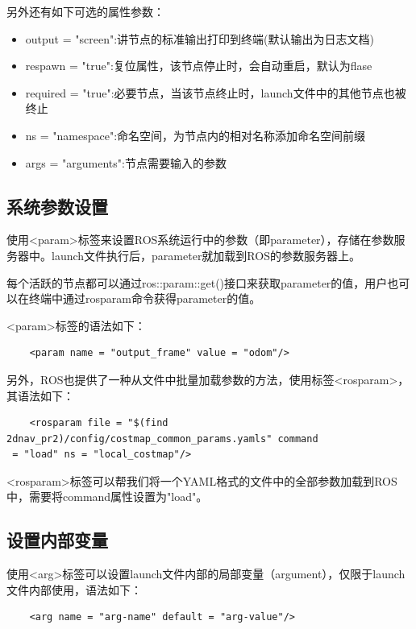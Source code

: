 \documentclass[10pt, oneside]{book}
\begin{document}
另外还有如下可选的属性参数：

\begin{itemize}
    \item output = "screen":讲节点的标准输出打印到终端(默认输出为日志文档)
    \item respawn = "true":复位属性，该节点停止时，会自动重启，默认为flase
    \item required = "true":必要节点，当该节点终止时，launch文件中的其他节点也被终止
    \item ns = "namespace":命名空间，为节点内的相对名称添加命名空间前缀
    \item args = "arguments":节点需要输入的参数
\end{itemize}

\subsection{系统参数设置}

使用<param>标签来设置ROS系统运行中的参数（即parameter），存储在参数服务器中。launch文件执行后，parameter就加载到ROS的参数服务器上。

每个活跃的节点都可以通过ros::param::get()接口来获取parameter的值，用户也可以在终端中通过rosparam命令获得parameter的值。

<param>标签的语法如下：

\begin{verbatim}
    <param name = "output_frame" value = "odom"/>
\end{verbatim}

另外，ROS也提供了一种从文件中批量加载参数的方法，使用标签<rosparam>，其语法如下：

\begin{verbatim}
    <rosparam file = "$(find 2dnav_pr2)/config/costmap_common_params.yamls" command
 = "load" ns = "local_costmap"/>
\end{verbatim}

<rosparam>标签可以帮我们将一个YAML格式的文件中的全部参数加载到ROS中，需要将command属性设置为"load"。

\subsection{设置内部变量}

使用<arg>标签可以设置launch文件内部的局部变量（argument），仅限于launch文件内部使用，语法如下：

\begin{verbatim}
    <arg name = "arg-name" default = "arg-value"/>
\end{verbatim}
\end{document}
